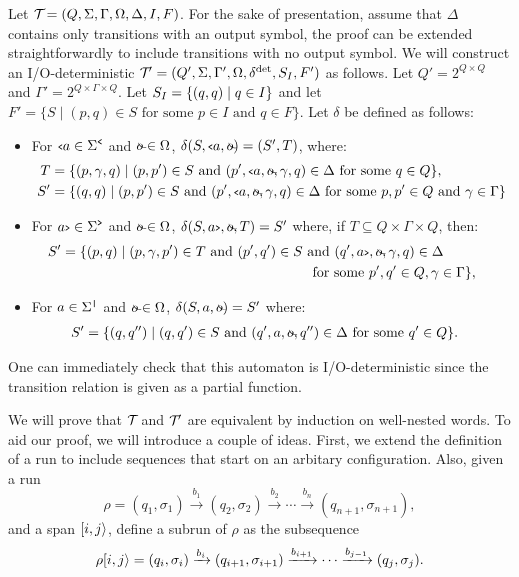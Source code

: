 
Let $\mathcal{T}\! = (Q, \Sigma, \Gamma, \Omega, \Delta, I, F)$.
	For the sake of presentation, assume that $\Delta$ contains only transitions with an output symbol, the proof can be extended straightforwardly to include transitions with no output symbol.
	We will construct an I/O-deterministic \vpann $\mathcal{T}\!' = ( Q', \Sigma, \Gamma', \Omega, \delta^{\operatorname{det}}, S_{I}, F')$ as follows.
	Let $Q' = 2^{Q\times Q}$ and $\Gamma' = 2^{Q\times\Gamma\times Q}$. 
	Let $S_I = \{(q,q)\mid q\in I\}$ and let $F' = \{S\mid (p,q)\in S\text{ for some }p\in I \text{ and } q\in F \}$. 
	Let $\delta$ be defined as follows:
	\begin{itemize}
		\item For ${\scriptsize\texttt{<}} a\in \Sigma^{\texttt{<}}$ and $\oout\in\Omega$, $\delta(S,\op{a},\oout) = (S',T)$, where:
		\begin{align*}
			T &= \{(p,\gamma,q)\mid (p,p')\in S \text{ and } (p',\op{a},\oout,\gamma,q)\in\Delta\text{ for some }q\in Q \},\\
			S'&= \{(q,q)\mid(p,p')\in S\text{ and }(p',\op{a},\oout,\gamma,q)\in\Delta\text{ for some }p,p'\in Q \text{ and } \gamma\in\Gamma\}
		\end{align*}
		\item For $a{\scriptsize\texttt{>}}\in\Sigma^{\texttt{>}}$ and $\oout\in\Omega$, $\delta(S,\cl{a},\oout,T) = S'$ where, if $T\subseteq Q\times\Gamma\times Q$, then: 
		\begin{align*}
			S' &= \{(p,q)\mid(p,\gamma,p')\in T\text{ and }(p',q')\in S\text{ and }(q',\cl{a},\oout,\gamma,q)\in\Delta\ \ \ \ \ \ \ \ \ \ \ \\ &\ \ \ \ \ \ \ \ \ \ \ \ \ \ \ \ \ \ \ \ \ \ \ \ \ \ \ \ \ \ \ \ \ \ \ \ \ \ \ \ \ \ \ \ \ \ \ \ \ \ \ \ \ \text{ for some }p',q'\in Q,\gamma\in\Gamma\},
		\end{align*}
		\item For $a\in\Sigma^{\texttt{|}}$ and $\oout\in\Omega$, $\delta(S,a,\oout) = S'$ where:
		\begin{align*}
			S' &= \{(q,q'')\mid (q,q')\in S\text{ and }(q',a,\oout,q'')\in\Delta\text{ for some }q'\in Q\}.
		\end{align*}
	\end{itemize}
	One can immediately check that this automaton is I/O-deterministic since the transition relation is given as a partial function.
	
	We will prove that $\mathcal{T}\!$ and $\mathcal{T}\!'$ are equivalent by induction on well-nested words. To aid our proof, we will introduce a couple of ideas. First, we extend the definition of a run to include sequences that start on an arbitary configuration. Also, given a run 
	$$
	\rho = (q_1, \sigma_1) \xrightarrow{b_1} (q_2, \sigma_2) \xrightarrow{b_2} \cdots  \xrightarrow{b_n} (q_{n+1}, \sigma_{n+1}),
	$$
	\noindent and a span $[i,j\rangle$, define a subrun of $\rho$ as the subsequence
	$$
	\rho[i,j\rangle = (q_i, \sigma_i) \xrightarrow{b_{i}} (q_{i+1}, \sigma_{i+1}) \xrightarrow{b_{i+1}} \cdots  \xrightarrow{b_{j-1}} (q_j, \sigma_j).
	$$
	
